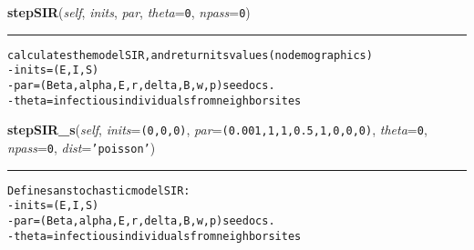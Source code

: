     \vspace{0.5ex}

    \begin{boxedminipage}{\textwidth}

    \raggedright \textbf{stepSIR}(\textit{self}, \textit{inits}, \textit{par}, \textit{theta}=\texttt{0}, \textit{npass}=\texttt{0})

    \vspace{-1.5ex}

    \rule{\textwidth}{0.5\fboxrule}
\begin{alltt}

calculates the model SIR, and return its values (no demographics)
- inits = (E,I,S)
- par = (Beta, alpha, E,r,delta,B, w, p) see docs.
- theta = infectious individuals from neighbor sites
\end{alltt}

    \vspace{1ex}

    \end{boxedminipage}

    \label{Epigrass:simobj:popmodels:stepSIR_s}

    \vspace{0.5ex}

    \begin{boxedminipage}{\textwidth}

    \raggedright \textbf{stepSIR\_s}(\textit{self}, \textit{inits}=\texttt{(0,0,0)}, \textit{par}=\texttt{(0.001,1,1,0.5,1,0,0,0)}, \textit{theta}=\texttt{0}, \textit{npass}=\texttt{0}, \textit{dist}=\texttt{'poisson'})

    \vspace{-1.5ex}

    \rule{\textwidth}{0.5\fboxrule}
\begin{alltt}

Defines an stochastic model SIR:
- inits = (E,I,S)
- par = (Beta, alpha, E,r,delta,B,w,p) see docs.
- theta = infectious individuals from neighbor sites
\end{alltt}

    \vspace{1ex}

    \end{boxedminipage}

    \label{Epigrass:simobj:popmodels:stepSEIS}

